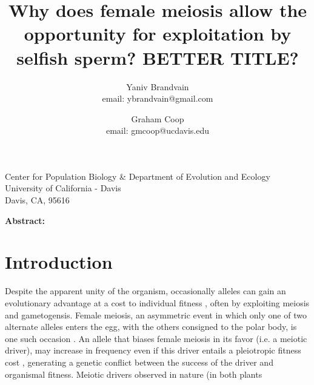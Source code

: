 \documentclass[12pt,letterpaper]{article}
\title{Why does female meiosis allow the opportunity for exploitation
  by selfish sperm? BETTER TITLE?}
\author{Yaniv Brandvain \\ email: ybrandvain@gmail.com  \and Graham Coop \\ email: gmcoop@ucdavis.edu }
\date{}
\begin{document}
\maketitle
\begin{center}
Center for Population Biology \& Department of Evolution and Ecology \\ University of California - Davis \\ Davis, CA, 95616
\end{center}

{\bf Abstract:}
\newpage

\section*{Introduction}

Despite the apparent unity of the organism, occasionally alleles can
gain an evolutionary advantage at a cost to  individual fitness
\citep{Burt2006}, often by exploiting meiosis and gametogensis.
Female meiosis, an asymmetric event in which only one of two alternate alleles
enters the  egg, with the others consigned to the polar body, is one such occasion \citep{Sandler1957,Pardo-ManuelDeVillena2001a}. 
An allele that biases female meiosis in its favor (i.e. a meiotic driver), may increase in frequency even if this driver entails a pleiotropic fitness cost \citep{Prout1973}, generating a genetic conflict between the success of the driver and organismal fitness.
Meiotic drivers observed in nature (in both plants
\end{document}
